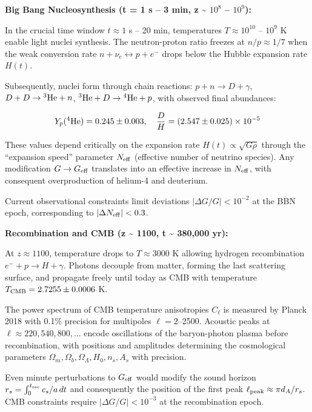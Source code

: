\documentclass[11pt,a4paper]{article}
\begin{document}
\textbf{Big Bang Nucleosynthesis (t = 1 s -- 3 min, z \textasciitilde{}
$10^{8}$ -- $10^{9}$):}

In the crucial time window \(t \approx 1\) s -- 20 min, temperatures
\(T \approx 10^{10}\) -- \(10^9\) K enable light nuclei synthesis. The
neutron-proton ratio freezes at \(n/p \approx 1/7\) when the weak
conversion rate \(n + \nu_e \leftrightarrow p + e^-\) drops below the
Hubble expansion rate \(H(t)\).

Subsequently, nuclei form through chain reactions:
\(p + n \to D + \gamma\), \(D + D \to {}^3{\rm He} + n\),
\({}^3{\rm He} + D \to {}^4{\rm He} + p\), with observed final
abundances:

\[Y_p({}^4{\rm He}) = 0.245 \pm 0.003, \quad \frac{D}{H} = (2.547 \pm 0.025) \times 10^{-5}\]

These values depend critically on the expansion rate
\(H(t) \propto \sqrt{G \rho}\) through the ``expansion speed'' parameter
\(N_{\rm eff}\) (effective number of neutrino species). Any modification
\(G \to G_{\rm eff}\) translates into an effective increase in
\(N_{\rm eff}\), with consequent overproduction of helium-4 and
deuterium.

Current observational constraints limit deviations
\(|\Delta G/G| < 10^{-2}\) at the BBN epoch, corresponding to
\(|\Delta N_{\rm eff}| < 0.3\).

\textbf{Recombination and CMB (z \textasciitilde{} 1100, t
\textasciitilde{} 380,000 yr):}

At \(z \approx 1100\), temperature drops to \(T \approx 3000\) K
allowing hydrogen recombination \(e^- + p \to H + \gamma\). Photons
decouple from matter, forming the last scattering surface, and propagate
freely until today as CMB with temperature
\(T_{\rm CMB} = 2.7255 \pm 0.0006\) K.

The power spectrum of CMB temperature anisotropies \(C_\ell\) is
measured by Planck 2018 with 0.1\% precision for multipoles
\(\ell = 2\)--2500. Acoustic peaks at
\(\ell \approx 220, 540, 800, \ldots\) encode oscillations of the
baryon-photon plasma before recombination, with positions and amplitudes
determining the cosmological parameters
\(\Omega_m, \Omega_b, \Omega_\Lambda, H_0, n_s, A_s\) with precision.

Even minute perturbations to \(G_{\rm eff}\) would modify the sound
horizon \(r_s = \int_0^{t_{\rm rec}} c_s/a\, dt\) and consequently the
position of the first peak \(\ell_{\rm peak} \approx \pi d_A/r_s\). CMB
constraints require \(|\Delta G/G| < 10^{-3}\) at the recombination
epoch.
\end{document}
